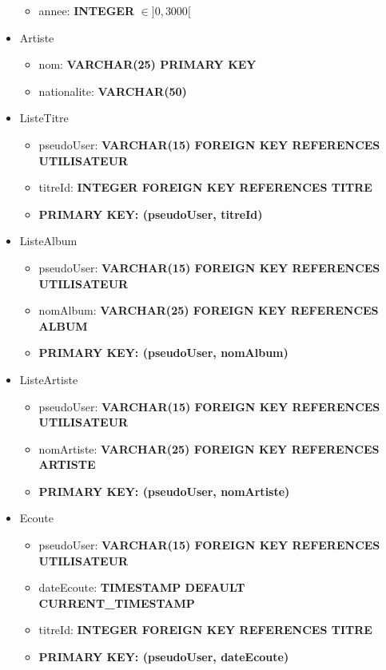\documentclass[a4paper,12pt, french]{report}
\begin{document}
\begin{itemize}
\begin{itemize}
          \item annee: \textbf{INTEGER} $\in ]0, 3000[$
        \end{itemize}
      \item Artiste
        \begin{itemize}
          \item nom: \textbf{VARCHAR(25) PRIMARY KEY}
          \item nationalite: \textbf{VARCHAR(50)}
        \end{itemize}
      \item ListeTitre
        \begin{itemize}
          \item pseudoUser: \textbf{VARCHAR(15) FOREIGN KEY REFERENCES UTILISATEUR}
          \item titreId: \textbf{INTEGER FOREIGN KEY REFERENCES TITRE}
          \item \textbf{PRIMARY KEY: (pseudoUser, titreId)}
        \end{itemize}
      \item ListeAlbum
        \begin{itemize}
          \item pseudoUser: \textbf{VARCHAR(15) FOREIGN KEY REFERENCES UTILISATEUR}
          \item nomAlbum: \textbf{VARCHAR(25) FOREIGN KEY REFERENCES ALBUM}
          \item \textbf{PRIMARY KEY: (pseudoUser, nomAlbum)}
        \end{itemize}
      \item ListeArtiste
        \begin{itemize}
          \item pseudoUser: \textbf{VARCHAR(15) FOREIGN KEY REFERENCES UTILISATEUR}
          \item nomArtiste: \textbf{VARCHAR(25) FOREIGN KEY REFERENCES ARTISTE}
          \item \textbf{PRIMARY KEY: (pseudoUser, nomArtiste)}
        \end{itemize}
      \item Ecoute
        \begin{itemize}
          \item pseudoUser: \textbf{VARCHAR(15) FOREIGN KEY REFERENCES UTILISATEUR}
          \item dateEcoute: \textbf{TIMESTAMP DEFAULT CURRENT\_TIMESTAMP}
          \item titreId: \textbf{INTEGER FOREIGN KEY REFERENCES TITRE}
          \item \textbf{PRIMARY KEY: (pseudoUser, dateEcoute)}

\end{itemize}
\end{itemize}
\end{document}
